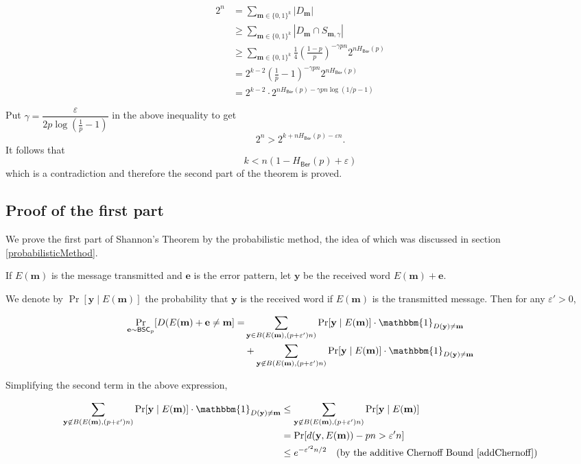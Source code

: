 \begin{align*}
    2^n &= \sum_{\textbf{m}\in\{0,1\}^k} |D_\textbf{m}| \\
        &\geq \sum_{\textbf{m}\in\{0,1\}^k} |D_\textbf{m}\cap S_{\textbf{m},\gamma}| \\
        &\geq \sum_{\textbf{m}\in\{0,1\}^k}\frac{1}{4} \left(\frac{1-p}{p}\right)^{-\gamma pn} 2^{n H_\mathsf{Ber}(p)} \\
        &= 2^{k-2} \left(\frac{1}{p}-1\right)^{-\gamma pn} 2^{n H_\mathsf{Ber}(p)} \\
        &= 2^{k-2}\cdot 2^{nH_\mathsf{Ber}(p)-\gamma pn\log(1/p-1)}
\end{align*}

Put $\gamma=\dfrac{\varepsilon}{2p\log\left(\frac{1}{p}-1\right)}$ in the above inequality to get
$$2^n > 2^{k+nH_\mathsf{Ber}(p)-\varepsilon n}.$$
It follows that
$$k<n(1-H_\mathsf{Ber}(p)+\varepsilon)$$
which is a contradiction and therefore the second part of the theorem is proved.

\subsection{Proof of the first part}

We prove the first part of Shannon's Theorem by the probabilistic method, the idea of which was discussed in section \ref{probabilisticMethod}.

If $E(\textbf{m})$ is the message transmitted and $\textbf{e}$ is the error pattern, let $\textbf{y}$ be the received word $E(\textbf{m})+\textbf{e}$.

We denote by $\Pr[\textbf{y}\mid E(\textbf{m})]$ the probability that $\textbf{y}$ is the received word if $E(\textbf{m})$ is the transmitted message. Then for any $\varepsilon'>0$,

\begin{align*}
\Pr_{\textbf{e}\sim\BSC_p}[D(E(\textbf{m})+\textbf{e}\neq \textbf{m}]= &\sum_{\textbf{y}\in B(E(\textbf{m}), (p+\varepsilon')n)}\Pr[\textbf{y}\mid E(\textbf{m})]\cdot \mathbbm{1}_{D(\textbf{y})\neq \textbf{m}} \\
&+ \sum_{\textbf{y}\not\in B(E(\textbf{m}), (p+\varepsilon')n)}\Pr[\textbf{y}\mid E(\textbf{m})]\cdot \mathbbm{1}_{D(\textbf{y})\neq \textbf{m}}
\end{align*}

Simplifying the second term in the above expression,

\begin{align*}
    \sum_{\textbf{y}\not\in B(E(\textbf{m}), (p+\varepsilon')n)}\Pr[\textbf{y}\mid E(\textbf{m})]\cdot \mathbbm{1}_{D(\textbf{y})\neq \textbf{m}} &\leq \sum_{\textbf{y}\not\in B(E(\textbf{m}), (p+\varepsilon')n)}\Pr[\textbf{y}\mid E(\textbf{m})] \\
    &= \Pr[d(\textbf{y}, E(\textbf{m}))-pn>\varepsilon'n] \\
    &\leq e^{-\varepsilon'^2n/2}\quad\text{(by the additive Chernoff Bound \ref{addChernoff})}
\end{align*}

